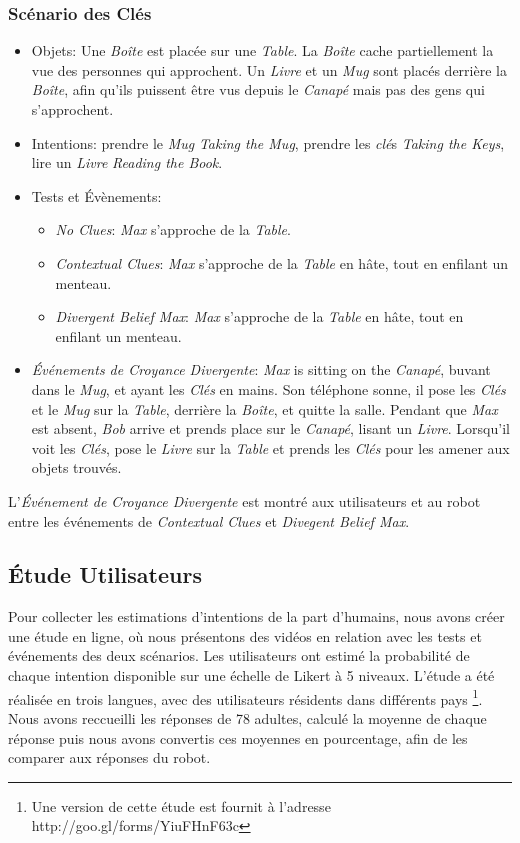 \documentclass[a4paper,11pt,twoside]{StyleThese}
\begin{document}
\subsubsection{Scénario des Clés}
\begin{itemize}
\item Objets: Une \textit{Boîte} est placée sur une \textit{Table}. La \textit{Boîte} cache partiellement la vue des personnes qui approchent. Un \textit{Livre} et un \textit{Mug} sont placés derrière la \textit{Boîte}, afin qu'ils puissent être vus depuis le \textit{Canapé} mais pas des gens qui s'approchent.
\item Intentions: prendre le \textit{Mug} \textit{Taking the Mug}, prendre les \textit{clé}s \textit{Taking the Keys}, lire un \textit{Livre} \textit{Reading the Book}.
\item Tests et Évènements:
\begin{itemize}
\item \textit{No Clues}: \textit{Max} s'approche de la \textit{Table}.
\item\textit{Contextual Clues}: \textit{Max} s'approche de la \textit{Table} en hâte, tout en enfilant un menteau.
\item \textit{Divergent Belief Max}: \textit{Max} s'approche de la \textit{Table} en hâte, tout en enfilant un menteau.
\end{itemize}
\item \textit{Événements de Croyance Divergente}: \textit{Max} is sitting on the \textit{Canapé}, buvant dans le \textit{Mug}, et ayant les \textit{Clés} en mains. Son téléphone sonne, il pose les \textit{Clés} et le \textit{Mug} sur la \textit{Table}, derrière la \textit{Boîte}, et quitte la salle. Pendant que \textit{Max} est absent, \textit{Bob} arrive et prends place sur le \textit{Canapé}, lisant un \textit{Livre}. Lorsqu'il voit les \textit{Clés}, pose le \textit{Livre} sur la \textit{Table} et prends les \textit{Clés} pour les amener aux objets trouvés.
\end{itemize}

L'\textit{Événement de Croyance Divergente} est montré aux utilisateurs et au robot entre les événements de \textit{Contextual Clues} et \textit{Divegent Belief Max}.

\subsection{Étude Utilisateurs}
Pour collecter les estimations d'intentions de la part d'humains, nous avons créer une étude en ligne, où nous présentons des vidéos en relation avec les tests et événements des deux scénarios. Les utilisateurs ont estimé la probabilité de chaque intention disponible sur une échelle de Likert à 5 niveaux. L'étude a été réalisée en trois langues, avec des utilisateurs résidents dans différents pays \footnote{Une version de cette étude est fournit à l'adresse http://goo.gl/forms/YiuFHnF63c}. Nous avons reccueilli les réponses de 78 adultes, calculé la moyenne de chaque réponse puis nous avons convertis ces moyennes en pourcentage, afin de les comparer aux réponses du robot.
\end{document}
